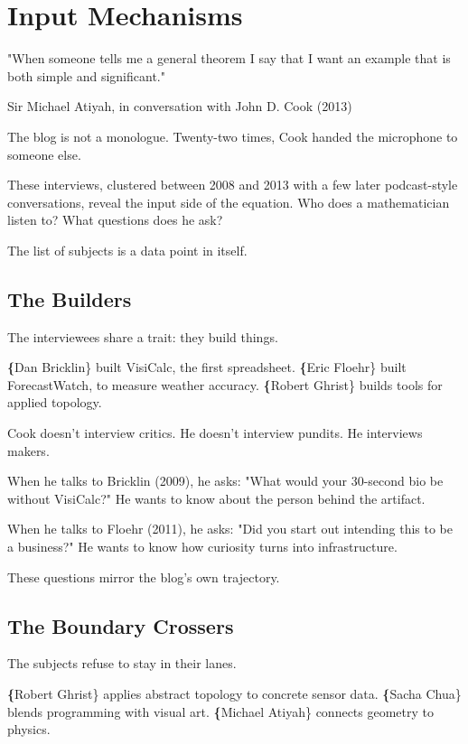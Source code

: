 \chapter{Input Mechanisms}

\epigraph{"When someone tells me a general theorem I say that I want an example that is both simple and significant."}{Sir Michael Atiyah, in conversation with John D. Cook (2013)}

\bigskip

The blog is not a monologue. Twenty-two times, Cook handed the microphone to someone else.

These interviews, clustered between 2008 and 2013 with a few later podcast-style conversations, reveal the input side of the equation. Who does a mathematician listen to? What questions does he ask?

The list of subjects is a data point in itself.

\bigskip

\section*{The Builders}

The interviewees share a trait: they build things.

\textbf\{Dan Bricklin\} built VisiCalc, the first spreadsheet.
\textbf\{Eric Floehr\} built ForecastWatch, to measure weather accuracy.
\textbf\{Robert Ghrist\} builds tools for applied topology.

Cook doesn't interview critics. He doesn't interview pundits. He interviews makers.

When he talks to Bricklin (2009), he asks: "What would your 30-second bio be without VisiCalc?" He wants to know about the person behind the artifact.

When he talks to Floehr (2011), he asks: "Did you start out intending this to be a business?" He wants to know how curiosity turns into infrastructure.

These questions mirror the blog's own trajectory.

\bigskip

\section*{The Boundary Crossers}

The subjects refuse to stay in their lanes.

\textbf\{Robert Ghrist\} applies abstract topology to concrete sensor data.
\textbf\{Sacha Chua\} blends programming with visual art.
\textbf\{Michael Atiyah\} connects geometry to physics.


